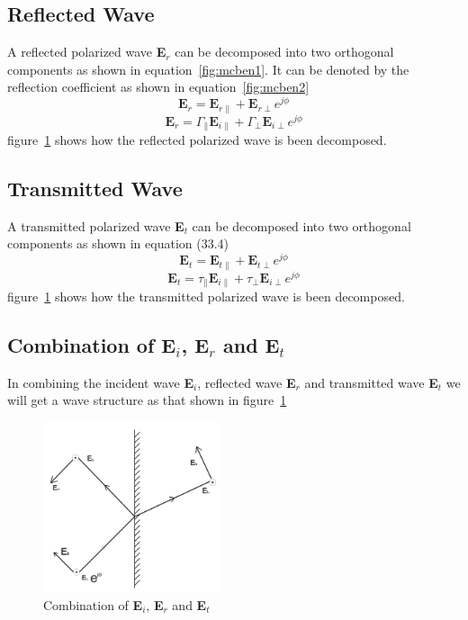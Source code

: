 \subsection{Reflected Wave}
A reflected polarized wave \textbf{E$_r$} can be decomposed into two orthogonal components as shown in equation~\ref{fig:mcben1}. It can be denoted by the reflection coefficient as shown in equation~\ref{fig:mcben2}
\begin{equation}
\textbf{E}_r = \textbf{E}_{r\parallel} + \textbf{E}_{r\perp} e^{j\phi}
\end{equation}	
\begin{equation}
\textbf{E}_r = \Gamma_\parallel \textbf{E}_{i\parallel} + \Gamma_\perp \textbf{E}_{i\perp} e^{j\phi}
\end{equation}	
figure~\ref{fig:mcben} shows how the reflected polarized wave is been decomposed.

\subsection{Transmitted Wave}
A transmitted polarized wave \textbf{E$_t$} can be decomposed into two orthogonal components as shown in equation (33.4)	
\begin{equation}
\textbf{E}_t = \textbf{E}_{t\parallel} + \textbf{E}_{t\perp} e^{j\phi}
\end{equation}	
\begin{equation}
\textbf{E}_t = \tau_\parallel \textbf{E}_{i\parallel} + \tau_\perp\textbf{E}_{i\perp} e^{j\phi}
\end{equation}	
figure~\ref{fig:mcben} shows how the transmitted polarized wave is been decomposed.	

\subsection{Combination of \textbf{E$_i$}, \textbf{E$_r$} and \textbf{E$_t$}}
In combining the incident wave \textbf{E$_i$}, reflected wave \textbf{E$_r$} and transmitted wave \textbf{E$_t$} we will get a wave structure as that shown in figure~\ref{fig:mcben}	
\begin{figure}[h]
\centering
\includegraphics[height=5cm]{./graphics/mcben}
\caption{Combination of \textbf{E$_i$}, \textbf{E$_r$} and \textbf{E$_t$}}
\label{fig:mcben}
\end{figure}

